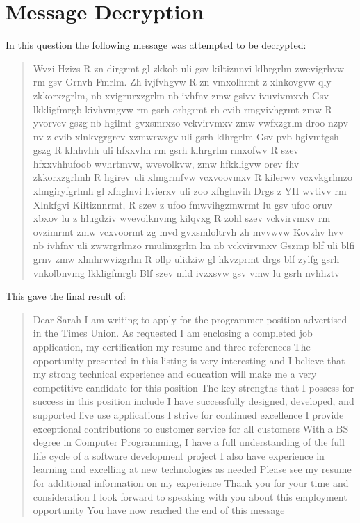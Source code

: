 \section{Message Decryption}
In this question the following message was attempted to be decrypted:

\begin{quote}
Wvzi Hzizs R zn dirgrmt gl zkkob uli gsv kiltiznnvi klhrgrlm zwevigrhvw rm gsv Grnvh Fmrlm.
Zh ivjfvhgvw R zn vmxolhrmt z xlnkovgvw qly zkkorxzgrlm, nb xvigrurxzgrlm nb ivhfnv zmw
gsivv ivuvivmxvh Gsv lkkligfmrgb kivhvmgvw rm gsrh orhgrmt rh evib rmgvivhgrmt zmw R
yvorvev gszg nb hgilmt gvxsmrxzo vckvirvmxv zmw vwfxzgrlm droo nzpv nv z evib xlnkvgrgrev
xzmwrwzgv uli gsrh klhrgrlm Gsv pvb hgivmtgsh gszg R klhhvhh uli hfxxvhh rm gsrh klhrgrlm
rmxofwv R szev hfxxvhhufoob wvhrtmvw, wvevolkvw, zmw hfkkligvw orev fhv zkkorxzgrlmh R
hgirev uli xlmgrmfvw vcxvoovmxv R kilerwv vcxvkgrlmzo xlmgiryfgrlmh gl xfhglnvi hvierxv uli
zoo xfhglnvih Drgs z YH wvtivv rm Xlnkfgvi Kiltiznnrmt, R szev z ufoo fmwvihgzmwrmt lu gsv
ufoo oruv xbxov lu z hlugdziv wvevolknvmg kilqvxg R zohl szev vckvirvmxv rm ovzimrmt zmw
vcxvoormt zg mvd gvxsmloltrvh zh mvvwvw Kovzhv hvv nb ivhfnv uli zwwrgrlmzo rmulinzgrlm
lm nb vckvirvmxv Gszmp blf uli blfi grnv zmw xlmhrwvizgrlm R ollp ulidziw gl hkvzprmt drgs
blf zylfg gsrh vnkolbnvmg lkkligfmrgb Blf szev mld ivzxsvw gsv vmw lu gsrh nvhhztv
\end{quote}

This gave the final result of:

\begin{quote}
Dear Sarah I am writing to apply for the programmer position advertised in the Times Union. As requested I am enclosing a completed job application, my certification my resume and three references The opportunity presented in this listing is very interesting and I believe that my strong technical experience and education will make me a very competitive candidate for this position The key strengths that I possess for success in this position include I have successfully designed, developed, and supported live use applications I strive for continued excellence I provide exceptional contributions to customer service for all customers With a BS degree in Computer Programming, I have a full understanding of the full life cycle of a software development project I also have experience in learning and excelling at new technologies as needed Please see my resume for additional information on my experience Thank you for your time and consideration I look forward to speaking with you about this employment opportunity You have now reached the end of this message
\end{quote}


